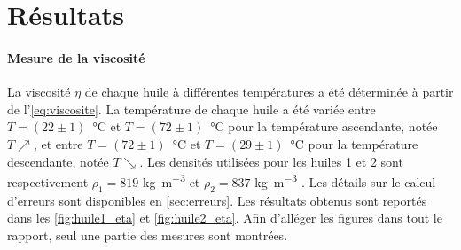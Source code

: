 \section{Résultats}

\paragraph{Mesure de la viscosité} La viscosité \(\eta\) de chaque huile à différentes températures a été déterminée à partir de l'\autoref{eq:viscosite}. La température de chaque huile a été variée entre \mbox{\(T=(22 \pm 1)\) \si{\celsius}} et \mbox{\(T=(72 \pm 1)\) \si{\celsius}} pour la température ascendante, notée \(T\nearrow\), et entre \mbox{\(T=(72 \pm 1)\) \si{\celsius}} et \mbox{\(T=(29 \pm 1)\) \si{\celsius}} pour la température descendante, notée \(T\searrow\). Les densités utilisées pour les huiles 1 et 2 sont respectivement \(\rho_1 = 819\) \si{\kilo\gram\per\cubic\meter} et \(\rho_2 = 837\) \si{\kilo\gram\per\cubic\meter} \cite{val_ref}. Les détails sur le calcul d'erreurs sont disponibles en \autoref{sec:erreurs}. Les résultats obtenus sont reportés dans les \autoref{fig:huile1_eta} et \autoref{fig:huile2_eta}. Afin d'alléger les figures dans tout le rapport, seul une partie des mesures sont montrées.

